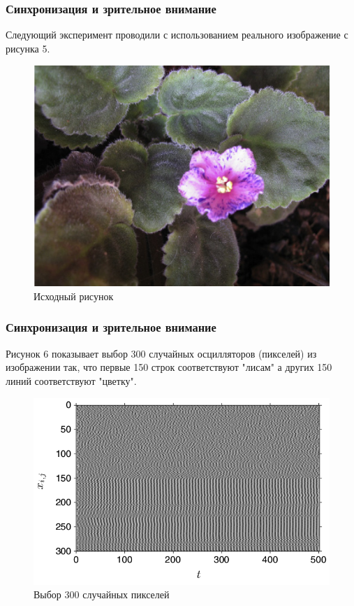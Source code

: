 \documentclass{beamer}
\begin{document}
\begin{frame}
\frametitle{Синхронизация и зрительное внимание}

Следующий эксперимент проводили с использованием реального изображение с рисунка 5.

\begin{figure}
\includegraphics[scale=0.30]{img/5}
\caption{Исходный рисунок}
\end{figure}

\end{frame}


\begin{frame}
\frametitle{Синхронизация и зрительное внимание}

Рисунок 6 показывает выбор 300 случайных осцилляторов (пикселей) из изображении так, что первые 150 строк соответствуют "лисам" а других 150 линий соответствуют "цветку".

\begin{figure}
\includegraphics[scale=0.32]{img/6}
\caption{Выбор 300 случайных пикселей}
\end{figure}
\end{frame}
\end{document}
